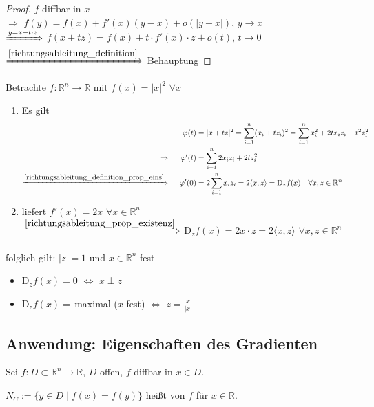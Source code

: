 \begin{proof}
	$f$ \gls{diffbar} in $x$ \\
	$\Rightarrow$ $f(y) = f(x) + f'(x) (y - x) + o(\vert y - x\vert)$, $y\to x$ \\
	$\xRightarrow{y=x+t\cdot z}$ $f(x + tz) = f(x) + t\cdot f'(x)\cdot z + o(t)$, $t\to 0$ \\
	$\xRightarrow{\eqref{richtungsableitung_definition}}$ Behauptung
\end{proof}

\begin{example}
	Betrachte $f:\mathbb{R}^n\to \mathbb{R}$ mit $f(x) = \vert x \vert ^2$ $\forall x$
	\begin{enumerate}[label={\alph*)}]
		\item Es gilt \zeroAmsmathAlignVSpaces \begin{alignat*}{2}
		 && \phi(t) &= \vert x + tz\vert ^2 = \sum_{i=1}^{n} (x_i + t z_i)^2 = \sum_{i=1}^n x_i^2 + 2t x_i z_i + t^2 z_i^2 \\
		 \Rightarrow && \phi'(t) &= \sum_{i=1}^n 2x_i z_i + 2t z_i^2 \\
		\xRightarrow{\eqref{richtungsableitung_definition_prop_eins}} &\;\;& \phi'(0) &= 2\sum_{i=1}^n x_i z_i = 2 \langle x,z\rangle = \mathrm{D}_z f(x)\quad\forall x, z\in\mathbb{R}^n
		\end{alignat*}
		\item {} liefert $f'(x) = 2x$ $\forall x\in\mathbb{R}^n$ \\
		$\xRightarrow{\eqref{richtungsableitung_prop_existenz}} $ $\mathrm{D}_z f(x) = 2x\cdot z = 2 \langle x,z\rangle$ $\forall x,z\in\mathbb{R}^n$
	\end{enumerate}
	folglich gilt: $\vert z \vert = 1$ und $x\in\mathbb{R}^n$ fest \begin{itemize}
		\item $\mathrm{D}_z f(x) = 0$ $\Leftrightarrow$ $x\perp z$
		\item $\mathrm{D}_z f(x) = \,$maximal ($x$ fest) $\Leftrightarrow$ $z = \frac{x}{\vert x \vert}$
	\end{itemize}
\end{example}

\subsection{Anwendung: Eigenschaften des Gradienten}
\begin{*definition}
	Sei $f:D\subset\mathbb{R}^n\to \mathbb{R}$, $D$ offen, $f$ \gls{diffbar} in $x\in D$.
	
	$N_C:= \{ y\in D \mid f(x) = f(y) \}$ heißt  von $f$ für $x\in \mathbb{R}$.

\end{*definition}	

